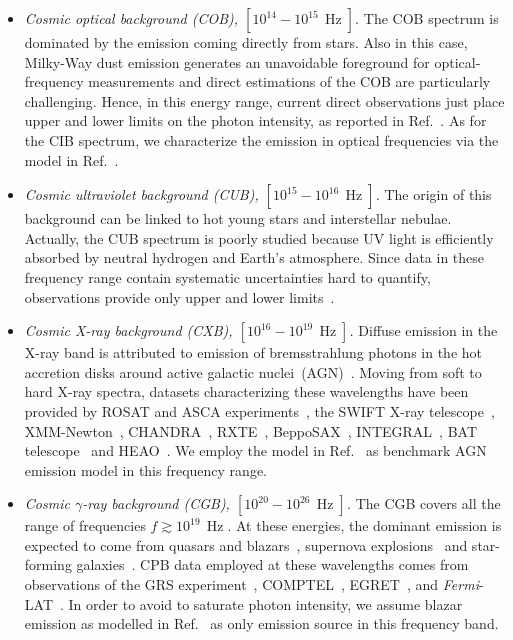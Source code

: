 \documentclass[twocolumn,superscriptaddress,floatfix,preprintnumbers, nofootinbib,hyperref]{revtex4-2}
\DeclareMathOperator{\Hz}{Hz}
\begin{document}
\begin{itemize}
    \item \textit{Cosmic optical background (COB), ${[10^{14}-10^{15}\,\Hz]}$.} The COB spectrum is dominated by the emission coming directly from stars. Also in this case, Milky-Way dust emission generates an unavoidable foreground for optical-frequency measurements and direct estimations of the COB are particularly challenging. Hence, in this energy range, current direct observations just place upper and lower limits on the photon intensity, as reported in Ref.~\cite{Hill:2018trh}. As for the CIB spectrum, we characterize the emission in optical frequencies via the model in Ref.~\cite{Dominguez:2010bv}.

    \item \textit{Cosmic ultraviolet background (CUB), ${[10^{15}-10^{16}\,\Hz]}$.} The origin of this background can be linked to hot young stars and interstellar nebulae. Actually, the CUB  spectrum is poorly studied because UV light is efficiently absorbed by neutral hydrogen and Earth's atmosphere. Since data in these frequency range contain systematic uncertainties hard to quantify, observations provide only upper and lower limits~\cite{Hill:2018trh}.

     \item \textit{Cosmic X-ray background (CXB), ${[10^{16}-10^{19}\,\Hz]}$.} Diffuse emission in the X-ray band is attributed to emission of bremsstrahlung photons in the hot accretion disks around active galactic nuclei~(AGN)~\cite{Comastri:1994bz}. Moving from soft to hard X-ray spectra, datasets characterizing these wavelengths have been provided by ROSAT and ASCA experiments~\cite{Miyaji:1998ez}, the SWIFT X-ray telescope~\cite{Moretti:2008hs}, XMM-Newton~\cite{DeLuca:2003eu}, CHANDRA~\cite{Cappelluti:2017miu}, RXTE~\cite{Revnivtsev:2003wm}, BeppoSAX~\cite{Frontera:2006zg}, INTEGRAL~\cite{Turler:2010pm}, BAT telescope~\cite{Ajello:2008xb} and HEAO~\cite{Gruber:1999yr}. We employ the model in Ref.~\cite{Ueda:2014tma} as benchmark AGN emission model in this frequency range.

     \item \textit{Cosmic $\gamma$-ray background (CGB), ${[10^{20}-10^{26}\,\Hz]}$.} The CGB covers all the range of frequencies ${f\gtrsim10^{19}\,\Hz}$. At these energies, the dominant emission is expected to come from quasars and blazars~\cite{Ajello:2015mfa}, supernova explosions~\cite{Ruiz-Lapuente:2000omh} and star-forming galaxies~\cite{Tamborra:2014xia}. CPB data employed at these wavelengths comes from observations of the GRS experiment~\cite{doi:10.1063/1.53933},  COMPTEL~\cite{Weidenspointner:2000aq}, EGRET~\cite{Strong:2004ry}, and \textit{Fermi}-LAT~\cite{Fermi-LAT:2014ryh}. In order to avoid to saturate photon intensity, we assume blazar emission as modelled in Ref.~\cite{Fornasa:2015qua} as only emission source in this frequency band.
\end{itemize}
\end{document}
